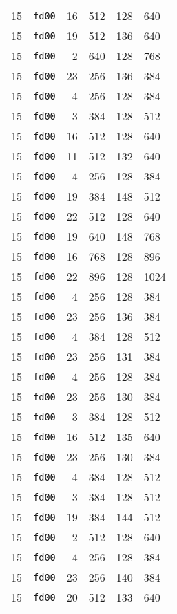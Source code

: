 \documentclass{article}
\begin{document}
\begin{table}[h!]
\begin{tabular}{llrrrl}
    15 & \texttt{fd00} & 16 & 512 & 128 & 640 \\
    15 & \texttt{fd00} & 19 & 512 & 136 & 640 \\
    15 & \texttt{fd00} & 2 & 640 & 128 & 768 \\
    15 & \texttt{fd00} & 23 & 256 & 136 & 384 \\
    15 & \texttt{fd00} & 4 & 256 & 128 & 384 \\
    15 & \texttt{fd00} & 3 & 384 & 128 & 512 \\
    15 & \texttt{fd00} & 16 & 512 & 128 & 640 \\
    15 & \texttt{fd00} & 11 & 512 & 132 & 640 \\
    15 & \texttt{fd00} & 4 & 256 & 128 & 384 \\
    15 & \texttt{fd00} & 19 & 384 & 148 & 512 \\
    15 & \texttt{fd00} & 22 & 512 & 128 & 640 \\
    15 & \texttt{fd00} & 19 & 640 & 148 & 768 \\
    15 & \texttt{fd00} & 16 & 768 & 128 & 896 \\
    15 & \texttt{fd00} & 22 & 896 & 128 & 1024 \\
    15 & \texttt{fd00} & 4 & 256 & 128 & 384 \\
    15 & \texttt{fd00} & 23 & 256 & 136 & 384 \\
    15 & \texttt{fd00} & 4 & 384 & 128 & 512 \\
    15 & \texttt{fd00} & 23 & 256 & 131 & 384 \\
    15 & \texttt{fd00} & 4 & 256 & 128 & 384 \\
    15 & \texttt{fd00} & 23 & 256 & 130 & 384 \\
    15 & \texttt{fd00} & 3 & 384 & 128 & 512 \\
    15 & \texttt{fd00} & 16 & 512 & 135 & 640 \\
    15 & \texttt{fd00} & 23 & 256 & 130 & 384 \\
    15 & \texttt{fd00} & 4 & 384 & 128 & 512 \\
    15 & \texttt{fd00} & 3 & 384 & 128 & 512 \\
    15 & \texttt{fd00} & 19 & 384 & 144 & 512 \\
    15 & \texttt{fd00} & 2 & 512 & 128 & 640 \\
    15 & \texttt{fd00} & 4 & 256 & 128 & 384 \\
    15 & \texttt{fd00} & 23 & 256 & 140 & 384 \\
    15 & \texttt{fd00} & 20 & 512 & 133 & 640 \\

\end{tabular}
\end{table}
\end{document}
